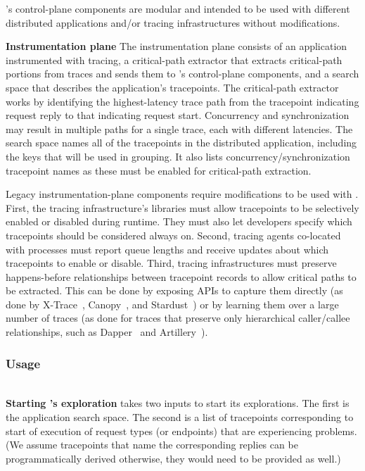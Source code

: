   \STAIF{}'s control-plane components are modular and intended to
  be used with different distributed applications and/or
  tracing infrastructures without modifications.
  
  \noindent\textbf{Instrumentation plane} The instrumentation plane
  consists of an application instrumented with tracing, a critical-path
  extractor that extracts critical-path portions from traces and sends
  them to \STAIF{}'s control-plane components, and a search space that
  describes the application's tracepoints.  The critical-path extractor
  works by identifying the highest-latency trace path from the
  tracepoint indicating request reply to that indicating request start.
  Concurrency and synchronization may result in multiple paths for a
  single trace, each with different latencies.  The search space names
  all of the tracepoints in the distributed application, including the
  keys that will be used in grouping.  It also lists
  concurrency/synchronization tracepoint names as these must be enabled
  for critical-path extraction.
  
  Legacy instrumentation-plane components require modifications to be
  used with \STAIF{}.  First, the tracing
  infrastructure's libraries must allow tracepoints to be selectively
  enabled or disabled during runtime.  They must also let developers
  specify which tracepoints should be considered always on. Second,
  tracing agents co-located with processes must report queue lengths and
  receive updates about which tracepoints to enable or disable. Third,
  tracing infrastructures must preserve happens-before relationships
  between tracepoint records to allow critical paths to be
  extracted. This can be done by exposing APIs to capture them directly
  (as done by X-Trace~\cite{Fonseca:2010vn, Mace:ui},
  Canopy~\cite{Kaldor:2017gp}, and Stardust~\cite{Sambasivan:2011vw}) or
  by learning them over a large number of traces (as done for traces
  that preserve only hierarchical caller/callee relationships, such as
  Dapper~\cite{Mann:2011vf} and Artillery~\cite{Chow:2014ts}).
  
  \vspace{-0.05in}
  \subsubsection{Usage}
  \label{sec:design:init}
  \hfill\\
  \noindent\textbf{Starting \STAIF{}'s exploration} \STAIF{} takes 
  two inputs to start its explorations.  The first is the application
  search space.  The second is a list of tracepoints corresponding to start
  of execution of request types (or endpoints) that are experiencing
  problems.  (We assume tracepoints that name the corresponding replies
  can be programmatically derived otherwise, they would need to be
  provided as well.)
  
